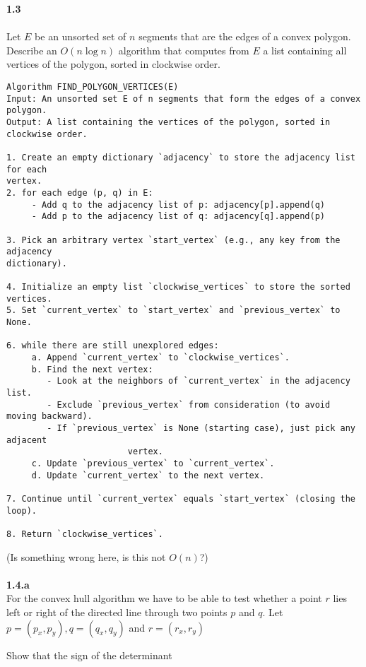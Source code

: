 \noindent
\textbf{1.3}\\\\
\noindent
Let $E$ be an unsorted set of $n$ segments that are the edges of a convex polygon. Describe an $O(n \log n)$ algorithm that computes from $E$ a list containing all vertices of the polygon, sorted in clockwise order.

\begin{verbatim}
Algorithm FIND_POLYGON_VERTICES(E)
Input: An unsorted set E of n segments that form the edges of a convex polygon.
Output: A list containing the vertices of the polygon, sorted in clockwise order.

1. Create an empty dictionary `adjacency` to store the adjacency list for each
vertex.
2. for each edge (p, q) in E:
     - Add q to the adjacency list of p: adjacency[p].append(q)
     - Add p to the adjacency list of q: adjacency[q].append(p)

3. Pick an arbitrary vertex `start_vertex` (e.g., any key from the adjacency
dictionary).

4. Initialize an empty list `clockwise_vertices` to store the sorted vertices.
5. Set `current_vertex` to `start_vertex` and `previous_vertex` to None.

6. while there are still unexplored edges:
     a. Append `current_vertex` to `clockwise_vertices`.
     b. Find the next vertex:
        - Look at the neighbors of `current_vertex` in the adjacency list.
        - Exclude `previous_vertex` from consideration (to avoid moving backward).
        - If `previous_vertex` is None (starting case), just pick any adjacent
						vertex.
     c. Update `previous_vertex` to `current_vertex`.
     d. Update `current_vertex` to the next vertex.

7. Continue until `current_vertex` equals `start_vertex` (closing the loop).

8. Return `clockwise_vertices`.
\end{verbatim}

(Is something wrong here, is this not $O(n)$?)
\\\\
\noindent
\textbf{1.4.a}\\
\noindent
For the convex hull algorithm we have to be able to test whether a point $r$ lies left or right of the directed line through two points $p$ and $q$. Let $p = (p_{x}, p_{y}), q = (q_{x}, q_{y})$ and $r = (r_{x}, r_{y})$

Show that the sign of the determinant

